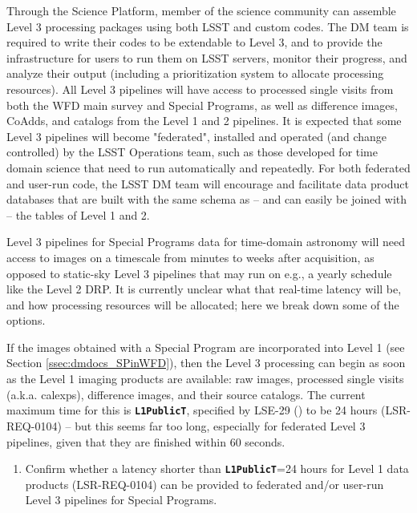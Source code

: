 \documentclass[DM,lsstdraft,toc]{lsstdoc}
\begin{document}
Through the Science Platform, member of the science community can assemble Level 3 processing packages using both LSST and custom codes. The DM team is required to write their codes to be extendable to Level 3, and to provide the infrastructure for users to run them on LSST servers, monitor their progress, and analyze their output (including a prioritization system to allocate processing resources). All Level 3 pipelines will have access to processed single visits from both the WFD main survey and Special Programs, as well as difference images, CoAdds, and catalogs from the Level 1 and 2 pipelines. It is expected that some Level 3 pipelines will become "federated", installed and operated (and change controlled) by the LSST Operations team, such as those developed for time domain science that need to run automatically and repeatedly. For both federated and user-run code, the LSST DM team will encourage and facilitate data product databases that are built with the same schema as -- and can easily be joined with -- the tables of Level 1 and 2.

Level 3 pipelines for Special Programs data for time-domain astronomy will need access to images on a timescale from minutes to weeks after acquisition, as opposed to static-sky Level 3 pipelines that may run on e.g., a yearly schedule like the Level 2 DRP. It is currently unclear what that real-time latency will be, and how processing resources will be allocated; here we break down some of the options.

If the images obtained with a Special Program are incorporated into Level 1 (see Section \ref{ssec:dmdocs_SPinWFD}), then the Level 3 processing can begin as soon as the Level 1 imaging products are available: raw images, processed single visits (a.k.a. calexps), difference images, and their source catalogs. The current maximum time for this is {\tt \textbf{L1PublicT}}, specified by LSE-29 (\citep{LSE-29}) to be 24 hours (LSR-REQ-0104) -- but this seems far too long, especially for federated Level 3 pipelines, given that they are finished within $60$ seconds.

\begin{enumerate}[resume,topsep=-10pt,label= \textbf{Concern \Roman*.}] \item \label{C2} Confirm whether a latency shorter than {\tt \textbf{L1PublicT}}=24 hours for Level 1 data products (LSR-REQ-0104) can be provided to federated and/or user-run Level 3 pipelines for Special Programs. \end{enumerate}
\end{document}
